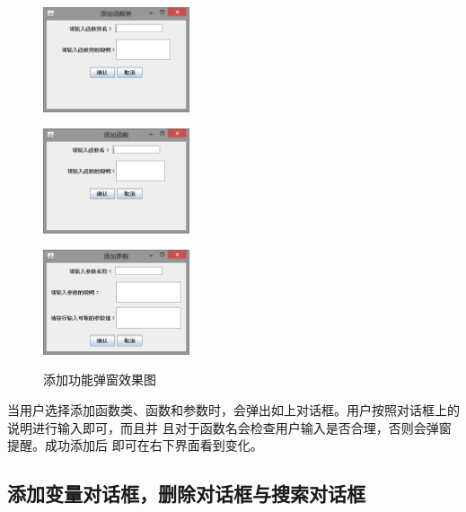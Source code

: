 \documentclass[hyperref, UTF8
,bookmarksnumbered=true, oneside]{ctexbook}
\begin{document}
			\begin{figure}[!h]
				\begin{minipage}[b]{0.3\textwidth}
				\centering
				\includegraphics[width=1.7in]{AddFuncClass.png}
				\label{pic:MathPack}
				\end{minipage}%
				\hspace{0.025\textwidth}%
				\begin{minipage}[b]{0.3\textwidth}
				\centering
				\includegraphics[width=1.7in]{AddMathFunc.png}
				\label{pic:GUIPack}
				\end{minipage}			
				\hspace{0.025\textwidth}%
				\begin{minipage}[b]{0.3\textwidth}
				\centering
				\includegraphics[width=1.7in]{AddPara.png}
				\label{pic:GUIPack}
				\end{minipage}
				\caption{添加功能弹窗效果图}
			\end{figure}

			当用户选择添加函数类、函数和参数时，会弹出如上对话框。用户按照对话框上的说明进行输入即可，而且并
且对于函数名会检查用户输入是否合理，否则会弹窗提醒。成功添加后
即可在右下界面看到变化。


		\subsection{添加变量对话框，删除对话框与搜索对话框} %
\end{document}
